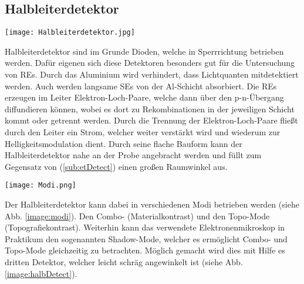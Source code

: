 \subsection*{Halbleiterdetektor}
\label{sub:halbDetect}
\begin{center}
    \texttt{[image: Halbleiterdetektor.jpg]}
    \label{image:halbDetect}
\end{center}
Halbleiterdetektor sind im Grunde Dioden, welche in Sperrrichtung betrieben werden. Dafür eigenen sich diese Detektoren besonders gut für die Untersuchung von REs. Durch das Aluminium wird verhindert, dass Lichtquanten mitdetektiert werden. Auch werden langsame SEs von der Al-Schicht absorbiert. Die REs erzeugen im Leiter Elektron-Loch-Paare, welche dann über den p-n-Übergang diffundieren können, wobei es dort zu Rekombinationen in der jeweiligen Schicht kommt oder getrennt werden. Durch die Trennung der Elektron-Loch-Paare fließt durch den Leiter ein Strom, welcher weiter verstärkt wird und wiederum zur Helligkeitsmodulation dient. Durch seine flache Bauform kann der Halbleiterdetektor nahe an der Probe angebracht werden und füllt zum Gegensatz von (\ref{sub:etDetect}) einen großen Raumwinkel aus. \citep{RasterEM}
\begin{center}
    \texttt{[image: Modi.png]}
    \label{image:modi}
\end{center}
Der Halbleiterdetektor kann dabei in verschiedenen Modi betrieben werden (siehe Abb. \ref{image:modi}). Den Combo- (Materialkontrast) und den Topo-Mode (Topografiekontrast).
Weiterhin kann das verwendete Elektronenmikroskop in Praktikum den sogenannten Shadow-Mode, welcher es ermöglicht Combo- und Topo-Mode gleichzeitig zu betrachten. Möglich gemacht wird dies mit Hilfe es dritten Detektor, welcher leicht schräg angewinkelt ist (siehe Abb. \ref{image:halbDetect}).

